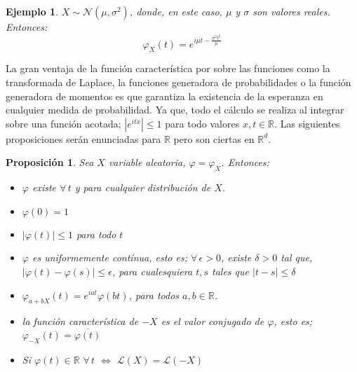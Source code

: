 \documentclass[a4paper]{article}
\newtheorem{ejemplo}{Ejemplo}
\newtheorem{prop}{Proposici\'on}
\numberwithin{equation}{subsection}
\def\R{\mathbb R}
\begin{document}
\begin{ejemplo}
 $X\sim \mathcal{N}(\mu,\sigma^{2})$, donde, en este caso, $\mu$ y $\sigma$ son valores reales. Entonces:
 \[\varphi_X(t) = e^{i\mu t -\frac{\sigma^2 t^2}{\mu}}\]
\end{ejemplo}

La gran ventaja de la función característica por sobre las funciones como la transformada de Laplace, la funciones generadora de probabilidades o la función generadora de momentos es que garantiza la existencia de la esperanza en cualquier medida de probabilidad. Ya que, todo el cálculo se realiza al integrar sobre una función acotada; $|e^{itx}|\leq 1$ para todo valores $x,t \in \R$. Las siguientes proposiciones serán enunciadas para $\R$ pero son ciertas en $\R^d$.

\begin{prop} Sea $X$ variable aleatoria, $\varphi = \varphi_X$. Entonces:
\begin{itemize}
    \item[i)] $\varphi$ existe $\forall\,t$ y para cualquier distribución de $X$.
    \item[ii)] $\varphi(0)=1$
    \item[iii)] $|\varphi(t)|\leq 1$ para todo $t$
    \item[iv)] $\varphi$ es uniformemente contínua, esto es; $\forall\,\epsilon >0$, existe $\delta >0$ tal que, $|\varphi(t)-\varphi(s)|\leq \epsilon$, para cualesquiera $t, s$ tales que $|t-s|\leq \delta$
    \item[v)] $\varphi_{a +bX}(t) = e^{iat}\varphi(bt)$, para todos $a,b\in\R$.
    \item[vi)] la función característica de $-X$ es el valor conjugado de $\varphi$, esto es; $\varphi_{-X}(t) = \overline{\varphi(t)}$
    \item[vii)] Si $\varphi(t)\in \R\,\,\forall\,t$ $\Longleftrightarrow$ $\mathcal{L}(X) = \mathcal{L}(-X)$
\end{itemize}
\end{prop}
\end{document}
